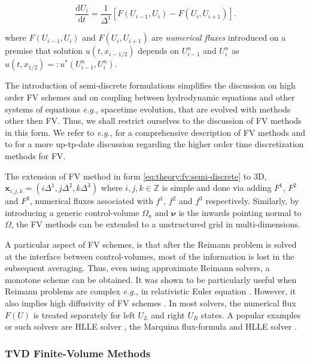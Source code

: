 \documentclass[11pt,a4paper,headinclude=true,DIV=14,BCOR=8mm,chapterprefix,listof=totoc,twoside,openright,abstracton]{scrbook}
\begin{document}
\begin{equation}
\frac{\text{d}U_i}{\text{d} t} = \frac{1}{\Delta^1}[F(U_{i-1}, U_{i}) - F(U_i, U_{i+1})].
\label{eq:theory:fv:semi-discrete}
\end{equation}

where $F(U_{i-1}, U_{i})$ and $F(U_i, U_{i+1})$ are \textit{numerical fluxes} introduced on a premise that solution $u(t, x_{i-1/2})$ depends on $U_{i-1} ^n$ and $U_{i} ^n$ as $u(t, x_{1/2}) =: u^* (U_{i-1}^{n}, U_{i}^n)$. 

The introduction of semi-discrete formulations simplifies the discussion on high order FV schemes and on coupling between hydrodynamic equations and other systems of equations \textit{e.g.,} spacetime evolution, that are evolved with methods other then FV. Thus, we shall restrict ourselves to the discussion of FV methods in this form. We refer to \textit{e.g.,} \cite{Toro:1999} for a comprehensive description of FV methods and to \cite{Gassner:2011} for a more up-tp-date discussion regarding the higher order time discretization methods for FV. 

The extension of FV method in form \ref{eq:theory:fv:semi-discrete} to 3D,  $\boldsymbol{x}_{i,j,k} = (i\Delta^1,j\Delta^2,k\Delta^3)$ where $i, j, k \in \mathbb{Z}$ is simple and done via adding $F^1$, $F^2$ and $F^3$, numerical fluxes associated with $f^1$, $f^2$ and $f^3$ respectively. Similarly, by introducing a generic control-volume $\Omega_a$ and $\boldsymbol{\nu}$ is the inwards pointing normal to $\Omega$, the FV methods can be extended to a unstructured grid in multi-dimensions.  

A particular aspect of FV schemes, is that after the Reimann problem is solved at the interface between control-volumes, most of the information is lost in the subsequent averaging. Thus, even using approximate Reimann solvers, a monotone scheme can be obtained. It was shown to be particularly useful when Reimann problems are complex \textit{e.g.,} in relativistic Euler equation \cite{Marti:1994,Pons:2000,Giacomazzo:2005jy}. However, it also implies high diffusivity of FV schemes \cite{Harten:1983}. In most solvers, the numerical flux $F(U)$ is treated separately for left $U_L$ and right $U_R$ states. A popular examples or such solvers are HLLE solver \cite{Roe:1981}, the Marquina flux-formula \cite{Donat:1996} and HLLE solver \cite{Einfeldt:1988}. 


\subsubsection{TVD Finite-Volume Methods}
\end{document}
